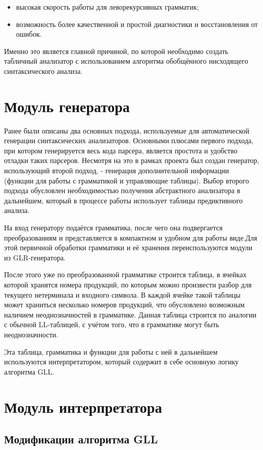 \begin{itemize}
\item высокая скорость работы для леворекурсивных грамматик;
\item возможность более качественной и простой диагностики и восстановления от ошибок.
\end{itemize}

Именно это является главной причиной, по которой необходимо создать табличный анализатор с использованием алгоритма обобщённого нисходящего синтаксического анализа.

\section{Модуль генератора}
Ранее были описаны два основных подхода, используемые для автоматической генерации синтаксических анализаторов. Основными плюсами первого подхода, при котором генерируется весь кода парсера, является простота и удобство отладки таких парсеров. Несмотря на это в рамках проекта был создан генератор, использующий второй подход, - генерация дополнительной информации (функции для работы с грамматикой и управляющие таблицы). Выбор второго подхода обусловлен необходимостью получения абстрактного анализатора в дальнейшем, который в процессе работы использует таблицы предиктивного анализа.

На вход генератору подаётся грамматика, после чего она подвергается преобразованиям и представляется в компактном и удобном для работы виде.Для этой первичной обработки грамматики и её хранения переиспользуются модули из GLR-генератора.

После этого уже по преобразованной грамматике строится таблица, в ячейках которой хранятся номера продукций, по которым можно произвести разбор для текущего нетерминала и входного символа. В каждой ячейке такой таблицы может храниться несколько номеров продукций, что обусловлено возможным наличием неоднозначностей в грамматике. Данная таблица строится по аналогии с обычной LL-таблицей, с учётом того, что в грамматике могут быть неоднозначности.

Эта таблица, грамматика и функции для работы с ней в дальнейшем используются интерпретатором, который содержит в себе основную логику алгоритма GLL.
\section{Модуль интерпретатора}
\subsection{Модификации алгоритма GLL}

